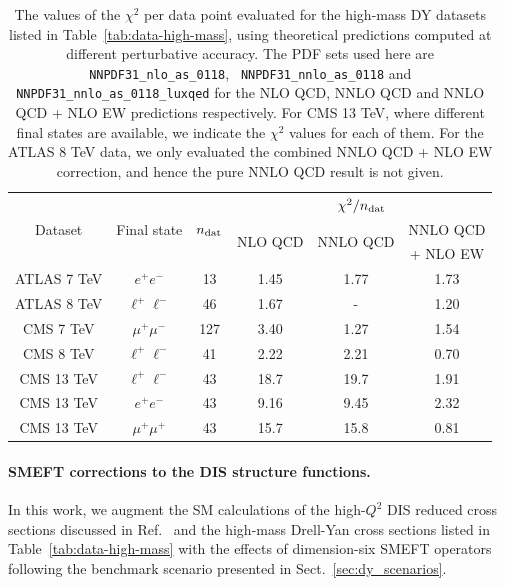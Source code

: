 \documentclass[withindex,glossary]{cam-thesis}
\begin{document}
\begin{table}[t]
  \renewcommand{\arraystretch}{1.40}
  \small
  \begin{center}
\begin{tabular}{c c c| c c c}
\toprule       
\multirow{3}{*}{Dataset} & \multirow{3}{*}{Final state} &  \multirow{3}{*}{$n_{\rm dat}$}    &  \multicolumn{3}{c}{$\chi^2/n_{\rm dat}$}   \\
      &  &      &  \multirow{2}{*}{NLO QCD}
           & \multirow{2}{*}{NNLO QCD}
& NNLO QCD \\
&  &      &  
           & 
& + NLO EW\\
\midrule
ATLAS 7 TeV  & $e^+e^-$            & 13  & 1.45  & 1.77  & 1.73 \\
ATLAS 8 TeV  & $\ell^+\ell^-$      & 46  & 1.67  & -     & 1.20 \\
\midrule
CMS 7 TeV    & $\mu^+\mu^-$        & 127 & 3.40  & 1.27  & 1.54 \\
CMS 8 TeV    & $\ell^+\ell^-$      & 41  & 2.22  & 2.21  & 0.70 \\
\midrule
CMS  13 TeV  & $\ell^+\ell^-$      & 43  & 18.7  & 19.7  & 1.91 \\
CMS  13 TeV  & $e^+e^-$            & 43  & 9.16  & 9.45  & 2.32 \\
CMS 13 TeV   & $\mu^+\mu^+$        & 43  & 15.7  & 15.8  & 0.81 \\
\bottomrule
\end{tabular}
\end{center}
  \caption{\label{tab:dysm}\small The values of the $\chi^2$ per data point
    evaluated for the  high-mass DY datasets listed in Table~\ref{tab:data-high-mass},
    using theoretical predictions computed at different perturbative accuracy.
    The PDF sets used here are {\tt NNPDF31\_nlo\_as\_0118}, {\tt
    NNPDF31\_nnlo\_as\_0118} and {\tt NNPDF31\_nnlo\_as\_0118\_luxqed} for
    the NLO QCD, NNLO QCD and NNLO QCD + NLO EW predictions respectively.
    For CMS 13 TeV, where different final states are available, we indicate the
    $\chi^2$ values for each of them.
    For the ATLAS 8 TeV data, we only evaluated the combined
    NNLO QCD + NLO EW correction, and hence the  pure NNLO QCD result is not given.
  }
\end{table}

\paragraph{SMEFT corrections to the DIS structure functions.} In this work, we augment the SM calculations of the high-$Q^2$ DIS
reduced cross sections discussed in Ref.~\cite{Carrazza:2019sec} and
the high-mass Drell-Yan cross sections listed in
Table~\ref{tab:data-high-mass} with the effects of dimension-six SMEFT operators following the benchmark scenario presented in
Sect.~\ref{sec:dy_scenarios}.
\end{document}

